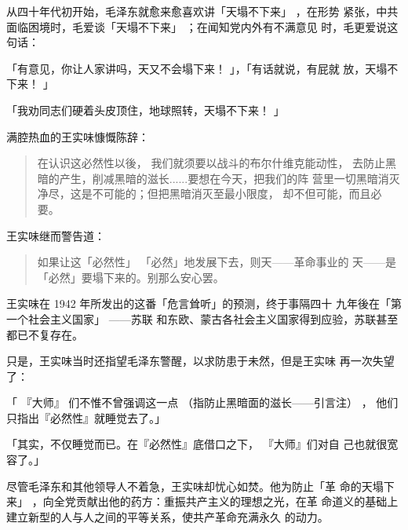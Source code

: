从四十年代初开始，毛泽东就愈来愈喜欢讲「天塌不下来」
，在形势
紧张，中共面临困境时，毛爱谈「天塌不下来」
；在闻知党内外有不满意见
时，毛更爱说这句话：

「有意见，你让人家讲吗，天又不会塌下来！
」，「有话就说，有屁就
放，天塌不下来！
」

「我劝同志们硬着头皮顶住，地球照转，天塌不下来！
」

满腔热血的王实味慷慨陈辞：
\begin{quote}
	
{\fzwkai 在认识这必然性以後，
我们就须要以战斗的布尔什维克能动性，
去防止黑暗的产生，削减黑暗的滋长......要想在今天，把我们的阵
营里一切黑暗消灭净尽，这是不可能的；但把黑暗消灭至最小限度，
却不但可能，而且必要。}
\end{quote}

王实味继而警告道：
\begin{quote}
	
{\fzwkai 如果让这「必然性」
「必然」地发展下去，则天——革命事业的
天——是「必然」要塌下来的。别那么安心罢。}
\end{quote}

王实味在 1942 年所发出的这番「危言耸听」的预测，终于事隔四十
九年後在「第一个社会主义国家」
——苏联
和东欧、蒙古各社会主义国家得到应验，苏联甚至都已不复存在。

只是，王实味当时还指望毛泽东警醒，以求防患于未然，但是王实味
再一次失望了：

「
『大师』
们不惟不曾强调这一点
（指防止黑暗面的滋长——引言注）
，
他们只指出『必然性』就睡觉去了。」


「其实，不仅睡觉而已。在『必然性』底借口之下，
『大师』们对自
己也就很宽容了。」

尽管毛泽东和其他领导人不着急，王实味却忧心如焚。他为防止「革
命的天塌下来」
，向全党贡献出他的药方：重振共产主义的理想之光，在革
命道义的基础上建立新型的人与人之间的平等关系，使共产革命充满永久
的动力。

